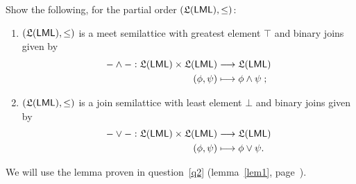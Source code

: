\documentclass[fontsize=16pt,a4paper,DIV=17,parskip=half]{scrartcl}
\renewcommand{\mathsf}[1]{\textup{\textsf{#1}}}
\theoremstyle{definition}
\begin{document}
  \begin{que}
    \label{q6}
    Show the following, for the partial order $(\mathfrak{L}(\mathsf{LML}), \le)$:
    \begin{enumerate}
      \item $(\mathfrak{L}(\mathsf{LML}), \le)$ is a meet semilattice with greatest element $\top$ and binary joins given by
        \begin{align*}
          - \wedge -: \mathfrak{L}(\mathsf{LML}) \times  \mathfrak{L}(\mathsf{LML}) &\longrightarrow  \mathfrak{L}(\mathsf{LML}) \\
          (\phi, \psi) &\longmapsto \phi \wedge \psi\;
        ;\end{align*}
      \item $(\mathfrak{L}(\mathsf{LML}), \le)$ is a join semilattice with least element $\bot$ and binary joins given by
        \begin{align*}
          - \vee -: \mathfrak{L}(\mathsf{LML}) \times  \mathfrak{L}(\mathsf{LML}) &\longrightarrow  \mathfrak{L}(\mathsf{LML}) \\
          (\phi, \psi) &\longmapsto \phi \vee \psi
        .\end{align*}
    \end{enumerate}
  \end{que}

  We will use the lemma proven in question~\ref{q2} (lemma~\ref{lem1}, page~\pageref{lem1}).
  
\end{document}

